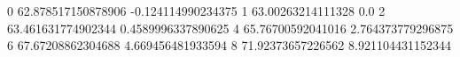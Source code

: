 0 62.878517150878906 -0.124114990234375
1 63.00263214111328 0.0
2 63.461631774902344 0.4589996337890625
4 65.76700592041016 2.764373779296875
6 67.67208862304688 4.669456481933594
8 71.92373657226562 8.921104431152344
